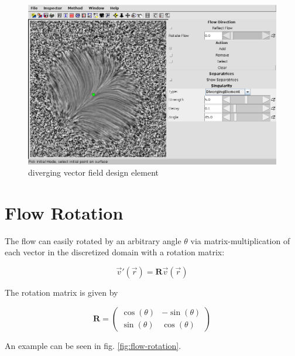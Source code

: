 \documentclass[a4paper,10pt,notitlepage]{scrreprt}
\newcommand{\mat}[1]{\mathbf{#1}}
\begin{document}
\begin{figure}
  \centering
  \includegraphics[scale=0.5]{img-3-2/diverging.png}
  \caption{diverging vector field design element}
  \label{fig:diverging}
\end{figure}

\section{Flow Rotation}

The flow can easily rotated by an arbitrary angle $\theta$ via
matrix-multiplication of each vector in the discretized domain with a rotation
matrix:

\begin{equation}
 \vec{v}'(\vec{r}) = \mat{R} \vec{v}(\vec{r})
\end{equation}

The rotation matrix is given by

\begin{equation}
 \mat{R} = \left(
\begin{array}{cc}
\cos(\theta) & -\sin(\theta) \\
\sin(\theta) & \cos(\theta) \end{array} \right)
\end{equation}

An example can be seen in fig. \ref{fig:flow-rotation}.
\end{document}
